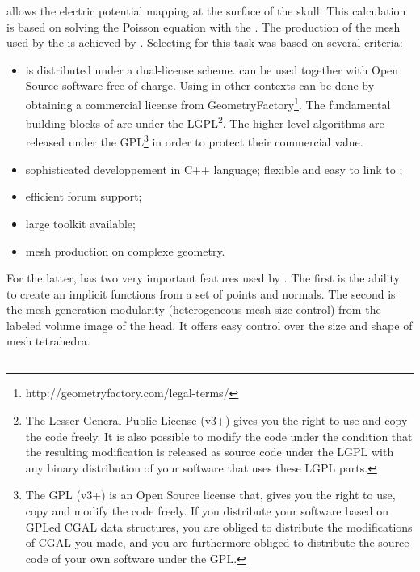 \FIJEE{} allows the electric potential mapping at the surface of the skull. This calculation is based on solving the Poisson equation with the \FEM{}. The production of the mesh used by the \FEM{} is achieved by \CGAL{}. Selecting \CGAL{} for this task was based on several criteria:


\begin{itemize}
\item \CGAL{} is distributed under a dual-license scheme. \CGAL{} can be used together with Open Source software free of charge. Using \CGAL{} in other contexts can be done by obtaining a commercial license from GeometryFactory\footnote{http://geometryfactory.com/legal-terms/}. The fundamental building blocks of \CGAL{} are under the LGPL\footnote{The Lesser General Public License (v3+) gives you the right to use and copy the code freely. It is also possible to modify the code under the condition that the resulting modification is released as source code under the LGPL with any binary distribution of your software that uses these LGPL parts.}. The higher-level algorithms are released under the GPL\footnote{The GPL (v3+) is an Open Source license that, gives you the right to use, copy and modify the code freely. If you distribute your software based on GPLed CGAL data structures, you are obliged to distribute the modifications of CGAL you made, and you are furthermore obliged to distribute the source code of your own software under the GPL.} in order to protect their commercial value.
\item sophisticated developpement in C++ language; flexible and easy to link to \FIJEE{};
\item efficient forum support;
\item large toolkit available;
\item mesh production on complexe geometry.
\end{itemize}

For the latter, \CGAL{} has two very important features used by \FIJEE{}. The first is the ability to create an implicit functions from a set of points and normals. The second is the mesh generation modularity (heterogeneous mesh size control) from the labeled volume image of the head.  It offers easy control over the size and shape of mesh tetrahedra.\\

\subsection{\FREESURFER{}}

